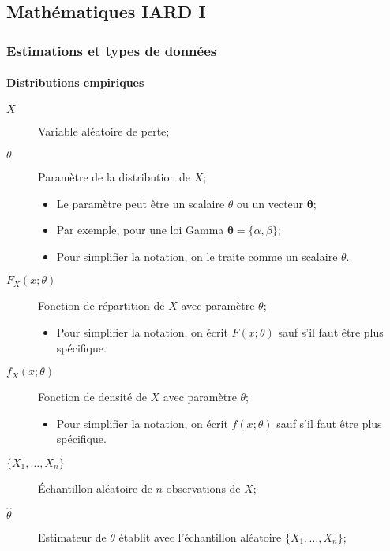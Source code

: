 \documentclass[10pt, french]{article}
\begin{document}
\begin{multicols*}{2}

\pagebreak

\part{Mathématiques IARD I}
\section{Estimations et types de données}
\subsection{Distributions empiriques}
\begin{distributions}[Notation]
\begin{description}
	\item[$X$]	Variable aléatoire de perte;
	\item[$\theta$]	Paramètre de la distribution de $X$;
		\begin{itemize}[leftmargin = *]
		\item	Le paramètre peut être un scalaire $\theta$ ou un vecteur $\bm{\theta}$;
		\item	Par exemple, pour une loi Gamma $\bm{\theta} = \{\alpha,	\beta\}$;
		\item	Pour simplifier la notation, on le traite comme un scalaire $\theta$.
		\end{itemize}
	\item[$F_{X}(x; \theta)$]	Fonction de répartition de $X$ avec paramètre $\theta$;
		\begin{itemize}[leftmargin = *]
		\item	Pour simplifier la notation, on écrit $F(x; \theta)$ sauf s'il faut être plus spécifique.
		\end{itemize}
	\item[$f_{X}(x; \theta)$]	Fonction de densité de $X$ avec paramètre $\theta$;
		\begin{itemize}[leftmargin = *]
		\item	Pour simplifier la notation, on écrit $f(x; \theta)$ sauf s'il faut être plus spécifique.
		\end{itemize}
	\item[$\{X_{1}, \dots, X_{n}\}$]	Échantillon aléatoire de $n$ observations de $X$;
	\item[$\hat{\theta}$]	Estimateur de $\theta$ établit avec l'échantillon aléatoire $\{X_{1}, \dots, X_{n}\}$;

\end{description}
\end{distributions}
\end{multicols*}
\end{document}
